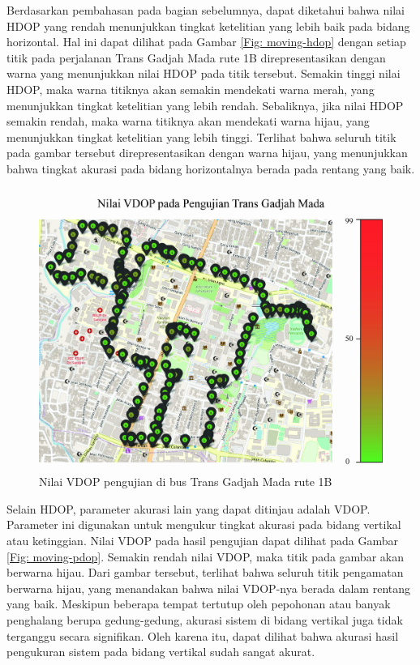 Berdasarkan pembahasan pada bagian sebelumnya, dapat diketahui bahwa nilai HDOP yang rendah menunjukkan tingkat ketelitian yang lebih baik pada bidang horizontal. Hal ini dapat dilihat pada Gambar \ref{Fig: moving-hdop} dengan setiap titik pada perjalanan Trans Gadjah Mada rute 1B direpresentasikan dengan warna yang menunjukkan nilai HDOP pada titik tersebut. Semakin tinggi nilai HDOP, maka warna titiknya akan semakin mendekati warna merah, yang menunjukkan tingkat ketelitian yang lebih rendah. Sebaliknya, jika nilai HDOP semakin rendah, maka warna titiknya akan mendekati warna hijau, yang menunjukkan tingkat ketelitian yang lebih tinggi. Terlihat bahwa seluruh titik pada gambar tersebut direpresentasikan dengan warna hijau, yang menunjukkan bahwa tingkat akurasi pada bidang horizontalnya berada pada rentang yang baik.

\begin{figure}[H]
	\centering
	\includegraphics[width=12cm]{contents/chapter-4/pengujian-bergerak/moving-VDOP.jpg}
	\caption{Nilai VDOP pengujian di bus Trans Gadjah Mada rute 1B}
	\label{Fig: moving-vdop}
\end{figure}

Selain HDOP, parameter akurasi lain yang dapat ditinjau adalah VDOP. Parameter ini digunakan untuk mengukur tingkat akurasi pada bidang vertikal atau ketinggian. Nilai VDOP pada hasil pengujian dapat dilihat pada Gambar \ref{Fig: moving-pdop}. Semakin rendah nilai VDOP, maka titik pada gambar akan berwarna hijau. Dari gambar tersebut, terlihat bahwa seluruh titik pengamatan berwarna hijau, yang menandakan bahwa nilai VDOP-nya berada dalam rentang yang baik. Meskipun beberapa tempat tertutup oleh pepohonan atau banyak penghalang berupa gedung-gedung, akurasi sistem di bidang vertikal juga tidak terganggu secara signifikan. Oleh karena itu, dapat dilihat bahwa akurasi hasil pengukuran sistem pada bidang vertikal sudah sangat akurat.

